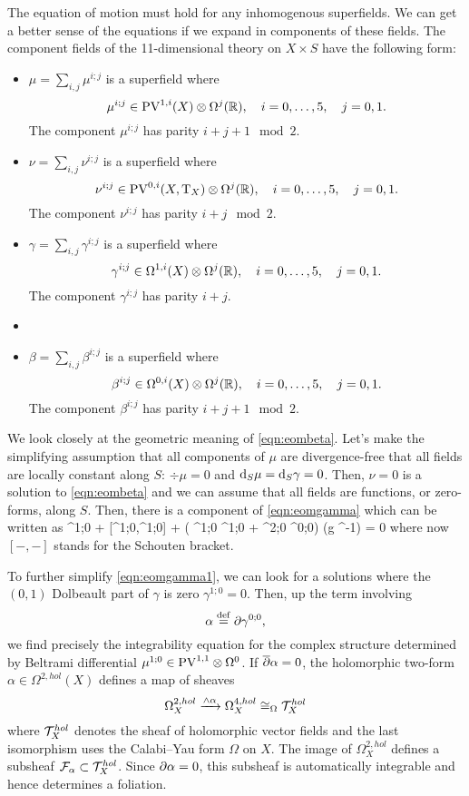 The equation of motion must hold for any inhomogenous superfields.
We can get a better sense of the equations if we expand in components of these fields. 
The component fields of the 11-dimensional theory on $X \times S$ have the following form: 
\begin{itemize}
\item $\mu = \sum_{i,j} \mu^{i;j}$ is a superfield where
\[
\mu^{i;j} \in {\rm PV}^{1,i}(X) \otimes \Omega^j(\mathbb R) ,\quad i=0,\ldots, 5, \quad j=0,1.
\]
The component $\mu^{i;j}$ has parity $i+j+1 \mod 2$. 
\item $\nu = \sum_{i,j} \nu^{i;j}$ is a superfield where
\[
\nu^{i;j} \in {\rm PV}^{0,i}(X, {\rm T}_X) \otimes \Omega^j(\mathbb R) ,\quad i=0,\ldots, 5, \quad j=0,1.
\]
The component $\nu^{i;j}$ has parity $i+j \mod 2$. 
\item 
$\gamma = \sum_{i,j} \gamma^{i;j}$ is a superfield where
\[
\gamma^{i;j} \in \Omega^{1,i}(X) \otimes \Omega^j(\mathbb R) ,\quad i=0,\ldots, 5, \quad j=0,1.
\]
The component $\gamma^{i;j}$ has parity $i+j$. 
\item 
\item $\beta = \sum_{i,j} \beta^{i;j}$ is a superfield where
\[
\beta^{i;j} \in \Omega^{0,i}(X) \otimes \Omega^j(\mathbb R) ,\quad i=0,\ldots, 5, \quad j=0,1.
\]
The component $\beta^{i;j}$ has parity $i+j+1 \mod 2$. 
\end{itemize}

We look closely at the geometric meaning of \eqref{eqn:eombeta}. 
Let's make the simplifying assumption that all components of $\mu$ are divergence-free that all fields are locally constant along $S$: $\div \mu = 0$ and ${\rm d}_S \mu = {\rm d}_S \gamma = 0$.
Then, $\nu = 0$ is a solution to \eqref{eqn:eombeta} and we can assume that all fields are functions, or zero-forms, along $S$. 
Then, there is a component of \eqref{eqn:eomgamma} which can be written as 
\beqn\label{eqn:eomgamma1}
\dbar \mu^{1;0} +  [\mu^{1;0},\mu^{1;0}] + \left( \del \gamma^{1;0} \wedge \del \gamma^{1;0} + \del \gamma^{2;0} \wedge \del \gamma^{0;0}\right) \vee (g \Omega^{-1}) = 0 
\eeqn
where now $[-,-]$ stands for the Schouten bracket.

To further simplify \eqref{eqn:eomgamma1}, we can look for a solutions where the $(0,1)$ Dolbeault part of $\gamma$ is zero $\gamma^{1;0} = 0$. 
Then, up the term involving 
\[
\alpha \overset{\rm def}{=} \partial \gamma^{0;0},
\]
we find precisely the integrability equation for the complex structure determined by Beltrami differential $\mu^{1;0} \in {\rm PV}^{1,1} \otimes \Omega^0$. 
If $\overline{\partial} \alpha = 0$, the holomorphic two-form $\alpha \in \Omega^{2,hol}(X)$ defines a map of sheaves
\[
\Omega^{2,hol}_X \xrightarrow{\wedge \alpha} \Omega^{4,hol}_X \cong_\Omega \mathcal T^{hol}_X
\]
where $\mathcal T^{hol}_X$ denotes the sheaf of holomorphic vector fields and the last isomorphism uses the Calabi--Yau form $\Omega$ on $X$.  
The image of $\Omega^{2,hol}_X$ defines a subsheaf $\mathcal F_{\alpha} \subset \mathcal T^{hol}_X$. 
Since $\partial \alpha = 0$, this subsheaf is automatically integrable and hence determines a foliation. 

